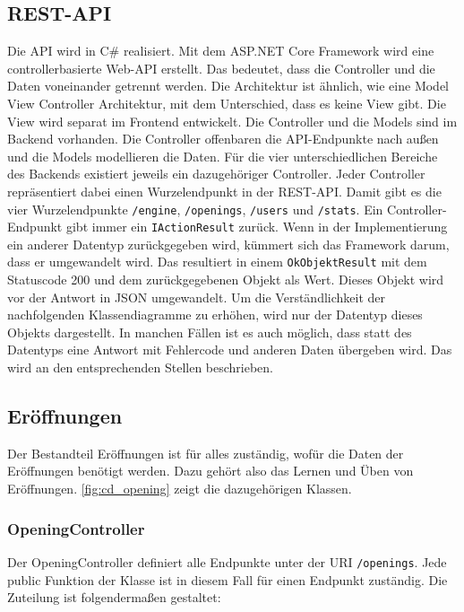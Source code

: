 \subsection{REST-API}
Die API wird in C\# realisiert. Mit dem ASP.NET Core Framework wird eine controllerbasierte Web-API erstellt. Das bedeutet, dass die Controller und die Daten voneinander getrennt werden. Die Architektur ist ähnlich, wie eine Model View Controller Architektur, mit dem Unterschied, dass es keine View gibt. Die View wird separat im Frontend entwickelt. Die Controller und die Models sind im Backend vorhanden. Die Controller offenbaren die API-Endpunkte nach außen und die Models modellieren die Daten. Für die vier unterschiedlichen Bereiche des Backends existiert jeweils ein dazugehöriger Controller. Jeder Controller repräsentiert dabei einen Wurzelendpunkt in der REST-API. Damit gibt es die vier Wurzelendpunkte \lstinline{/engine}, \lstinline{/openings}, \lstinline{/users} und \lstinline{/stats}. Ein Controller-Endpunkt gibt immer ein \lstinline{IActionResult} zurück. Wenn in der Implementierung ein anderer Datentyp zurückgegeben wird, kümmert sich das Framework darum, dass er umgewandelt wird. Das resultiert in einem \lstinline{OkObjektResult} mit dem Statuscode 200 und dem zurückgegebenen Objekt als Wert. Dieses Objekt wird vor der Antwort in JSON umgewandelt. Um die Verständlichkeit der nachfolgenden Klassendiagramme zu erhöhen, wird nur der Datentyp dieses Objekts dargestellt. In manchen Fällen ist es auch möglich, dass statt des Datentyps eine Antwort mit Fehlercode und anderen Daten übergeben wird. Das wird an den entsprechenden Stellen beschrieben.

\subsection{Eröffnungen}
\label{cp:openings}
Der Bestandteil Eröffnungen ist für alles zuständig, wofür die Daten der Eröffnungen benötigt werden. Dazu gehört also das Lernen und Üben von Eröffnungen. \autoref{fig:cd_opening} zeigt die dazugehörigen Klassen.

\subsubsection{OpeningController}
Der OpeningController definiert alle Endpunkte unter der URI \lstinline{/openings}.
Jede public Funktion der Klasse ist in diesem Fall für einen Endpunkt zuständig. Die Zuteilung ist folgendermaßen gestaltet:

